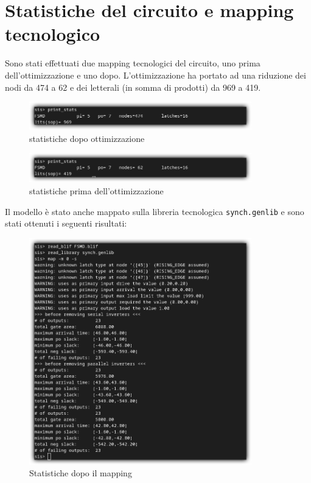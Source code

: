 \documentclass[a4paper]{report}
\begin{document}
\clearpage %


\section{Statistiche del circuito e mapping tecnologico}

Sono stati effettuati due mapping tecnologici del circuito, uno prima dell'ottimizzazione e uno dopo.
L'ottimizzazione ha portato ad una riduzione dei nodi da 474 a 62 e dei letterali (in somma di prodotti) da 969 a 419.

  \begin{figure}[ht]
    \centering
      \includegraphics[width=0.86\textwidth]{not_opt.png}
      \caption{statistiche dopo ottimizzazione}
      \label{img:opt.png}
  \end{figure}

  \begin{figure}[h]
    \centering
      \includegraphics[width=0.86\textwidth]{opt.png}
      \caption{statistiche prima dell'ottimizzazione}
      \label{img:not_opt.png}
  \end{figure}


  Il modello è stato anche mappato sulla libreria tecnologica \texttt{synch.genlib} e sono stati ottenuti i seguenti risultati:
  \begin{figure}[hb]
    \centering
      \includegraphics[width=0.86\textwidth]{mapping.png}
      \caption{Statistiche dopo il mapping}
      \label{img:mapping.png}
  \end{figure}
\end{document}
